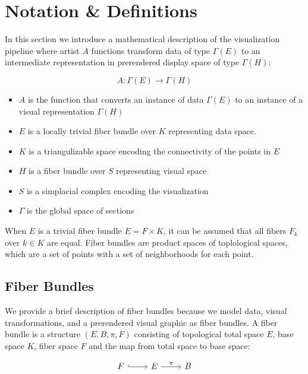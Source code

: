 \documentclass[../main.tex]{subfiles}
\begin{document}
\section{Notation \& Definitions}
In this section we introduce a mathematical description of the visualization pipeline where artist $A$ functions transform data of type $\Gamma(E)$ to an intermediate representation in prerendered display space of type $\Gamma(H)$:

\begin{equation}
    \label{eq:artist}
    A: \Gamma(E) \rightarrow \Gamma(H)
\end{equation}

\begin{itemize}
\item $A$ is the function that converts an instance of data $\Gamma(E)$ to an instance of a visual representation $\Gamma(H)$ 
\item $E$ is a locally trivial fiber bundle over $K$ representing data space.
\item $K$ is a triangulizable space encoding the connectivity of the points in $E$
\item $H$ is a fiber bundle over $S$ representing visual space
\item $S$ is a simplacial complex encoding the visualization
\item $\Gamma$ is the global space of sections
\end{itemize}

When $E$ is a trivial fiber bundle $E = F \times K$, it can be assumed that all fibers $F_{k}$ over $k \in K$ are equal. Fiber bundles are product spaces of toplological spaces, which are a set of points with a set of neighborhoods for each point\cite{FiberBundle2020, rowlandFiberBundle}.

\subsection{Fiber Bundles}
We provide a brief description of fiber bundles because we model data, visual transformations, and a prerendered visual graphic as fiber bundles. A fiber bundle is a structure $(E, B, \pi, F)$  consisting of topological total space $E$, base space $K$, fiber space $F$ and the map from total space to base space:

\begin{equation}
    \label{eq:fiber_bundle}
    \begin{tikzcd}
        F \arrow[r, hook] & E \arrow[r, "\pi"] & B
    \end{tikzcd}
\end{equation}
\end{document}

